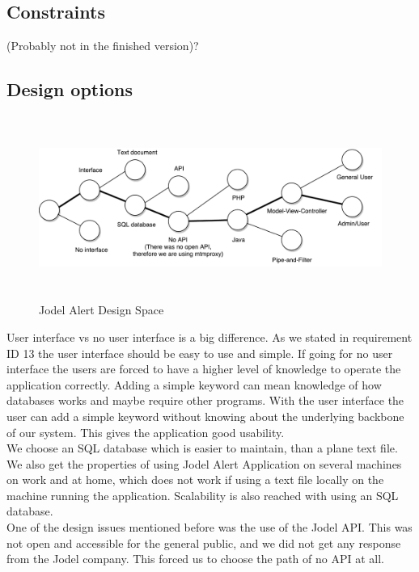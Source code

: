 \documentclass[a4paper,12pt]{article}
\begin{document}
\subsection{Constraints}
(Probably not in the finished version)?
\subsection{Design options}
\begin{figure}[!h]
	\centering
	\includegraphics[height=6cm]{img/designspace.pdf}
	\caption{Jodel Alert Design Space}
	\label{Design space}
\end{figure}
User interface vs no user interface is a big difference. As we stated in requirement ID 13 the user interface should be easy to use and simple. If going for no user interface the users are forced to have a higher level of knowledge to operate the application correctly. Adding a simple keyword can mean knowledge of how databases works and maybe require other programs. With the user interface the user can add a simple keyword without knowing about the underlying backbone of our system.
This gives the application good usability.\\

We choose an SQL database which is easier to maintain, than a plane text file. We also get the properties of using Jodel Alert Application on several machines on work and at home, which does not work if using a text file locally on the machine running the application.
Scalability is also reached with using an SQL database.\\

One of the design issues mentioned before was the use of the Jodel API. This was not open and accessible for the general public, and we did not get any response from the Jodel company. This forced us to choose the path of no API at all.
\clearpage
\end{document}
